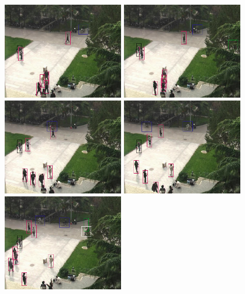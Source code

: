 \begin{figure}
\centering
\includegraphics[width=0.47\textwidth,bb=0 0 720 576]{016.jpg}
\includegraphics[width=0.47\textwidth,bb=0 0 720 576]{026.jpg}
\includegraphics[width=0.47\textwidth,bb=0 0 720 576]{071.jpg}
\includegraphics[width=0.47\textwidth,bb=0 0 720 576]{116.jpg}\\
\includegraphics[width=0.47\textwidth,bb=0 0 720 576]{166.jpg}

\end{figure}
